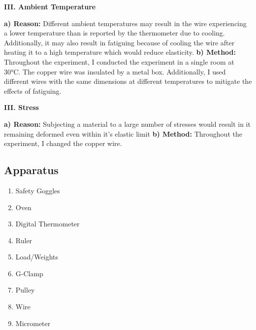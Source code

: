 \documentclass{article}
\begin{document}
\begin{spacing}{2}
    \textbf{III. Ambient Temperature}
\end{spacing}

\hfill\begin{minipage}{\dimexpr\textwidth-1cm}
\par{\textbf{a) Reason:} Different ambient temperatures may result in the wire experiencing a lower temperature than is reported by the thermometer due to cooling. Additionally, it may also result in fatiguing because of cooling the wire after heating it to a high temperature which would reduce elasticity. \newline
\textbf{b) Method:} Throughout the experiment, I conducted the experiment in a single room at 30°C. The copper wire was insulated by a metal box. Additionally, I used different wires with the same dimensions at different temperatures to mitigate the effects of fatiguing.\newline}
\xdef\tpd{\the\prevdepth}
\end{minipage}

\begin{spacing}{2}
    \textbf{III. Stress}
\end{spacing}

\hfill\begin{minipage}{\dimexpr\textwidth-1cm}
\par{\textbf{a) Reason:} Subjecting a material to a large number of stresses would result in it remaining deformed even within it's elastic limit \newline
\textbf{b) Method:} Throughout the experiment, I changed the copper wire.\newline}
\xdef\tpd{\the\prevdepth}
\end{minipage}

\vspace{-1cm}
\subsection{Apparatus}

\begin{enumerate}
    \item Safety Goggles
    \item Oven
    \item Digital Thermometer
    \item Ruler
    \item Load/Weights 
    \item G-Clamp
    \item Pulley
    \item Wire
    \item Micrometer
\end{enumerate}
\vspace{-0.5cm}
\end{document}
